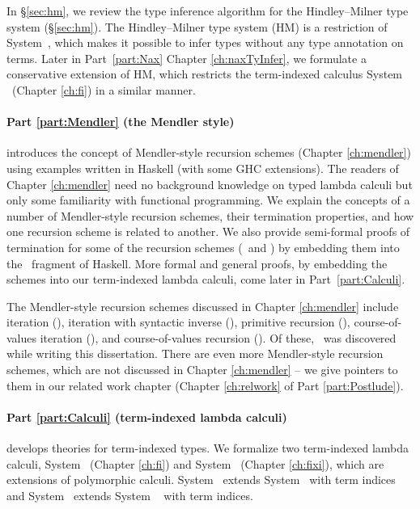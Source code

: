In \S\ref{sec:hm}, we review the type inference algorithm for
the Hindley--Milner type system (\S\ref{sec:hm}).
The Hindley--Milner type system (HM) is a restriction of System~\F,
which makes it possible to infer types without any type annotation on terms.
Later in Part~\ref{part:Nax} Chapter \ref{ch:naxTyInfer},
we formulate a conservative extension of HM, which restricts
the term-indexed calculus System \Fi\ (Chapter \ref{ch:fi}) in a similar manner.

\paragraph{Part \ref{part:Mendler} (the Mendler style)}\hspace{-1em}
introduces
the concept of Mendler-style recursion schemes (Chapter \ref{ch:mendler})
using examples written in Haskell (with some GHC extensions). The readers
of Chapter \ref{ch:mendler} need no background knowledge
on typed lambda calculi but only some familiarity with functional programming.
We explain the concepts of a number of Mendler-style recursion schemes,
their termination properties, and how one recursion scheme is related to
another. We also provide semi-formal proofs of termination for some of
the recursion schemes (\MIt\ and \MsfIt) by embedding them into
the \Fw\ fragment of Haskell. More formal and general proofs,
by embedding the schemes into our term-indexed lambda calculi,
come later in Part~\ref{part:Calculi}.

The Mendler-style recursion schemes discussed in Chapter \ref{ch:mendler}
include iteration (\MIt), iteration with syntactic inverse (\MsfIt),
primitive recursion (\MPr), course-of-values iteration (\McvIt),
and course-of-values recursion (\McvPr). Of these, \MsfIt\ was discovered
while writing this dissertation.
There are even more Mendler-style recursion schemes, which are not
discussed in Chapter \ref{ch:mendler} -- we give pointers to them in our
related work chapter (Chapter \ref{ch:relwork} of Part \ref{part:Postlude}).

\paragraph{Part \ref{part:Calculi} (term-indexed lambda calculi)}\hspace{-1em}
develops theories for term-indexed types.
We formalize two term-indexed lambda calculi,
System \Fi\ (Chapter \ref{ch:fi}) and System \Fixi\ (Chapter \ref{ch:fixi}),
which are extensions of polymorphic calculi.
System \Fi\ extends System \Fw\ with term indices and
System \Fixi\ extends System \Fixw\ \cite{AbeMat04} with term indices.

